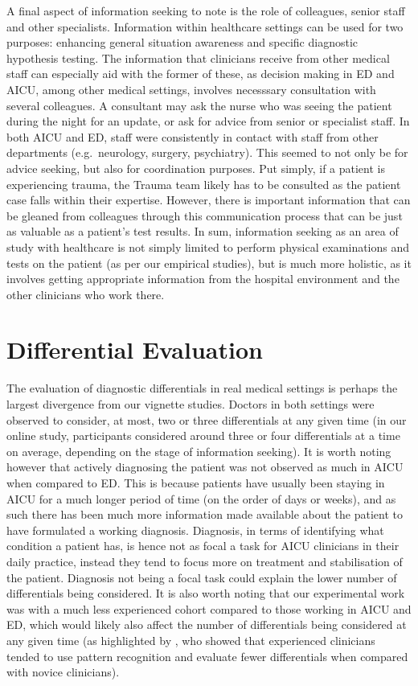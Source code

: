 \documentclass[a4paper, nobind]{templates/ociamthesis}
\begin{document}
\hfill\break
A final aspect of information seeking to note is the role of colleagues, senior staff and other specialists. Information within healthcare settings can be used for two purposes: enhancing general situation awareness and specific diagnostic hypothesis testing. The information that clinicians receive from other medical staff can especially aid with the former of these, as decision making in ED and AICU, among other medical settings, involves necesssary consultation with several colleagues. A consultant may ask the nurse who was seeing the patient during the night for an update, or ask for advice from senior or specialist staff. In both AICU and ED, staff were consistently in contact with staff from other departments (e.g.~neurology, surgery, psychiatry). This seemed to not only be for advice seeking, but also for coordination purposes. Put simply, if a patient is experiencing trauma, the Trauma team likely has to be consulted as the patient case falls within their expertise. However, there is important information that can be gleaned from colleagues through this communication process that can be just as valuable as a patient's test results. In sum, information seeking as an area of study with healthcare is not simply limited to perform physical examinations and tests on the patient (as per our empirical studies), but is much more holistic, as it involves getting appropriate information from the hospital environment and the other clinicians who work there.

\section{Differential Evaluation}\label{differential-evaluation}

The evaluation of diagnostic differentials in real medical settings is perhaps the largest divergence from our vignette studies. Doctors in both settings were observed to consider, at most, two or three differentials at any given time (in our online study, participants considered around three or four differentials at a time on average, depending on the stage of information seeking). It is worth noting however that actively diagnosing the patient was not observed as much in AICU when compared to ED. This is because patients have usually been staying in AICU for a much longer period of time (on the order of days or weeks), and as such there has been much more information made available about the patient to have formulated a working diagnosis. Diagnosis, in terms of identifying what condition a patient has, is hence not as focal a task for AICU clinicians in their daily practice, instead they tend to focus more on treatment and stabilisation of the patient. Diagnosis not being a focal task could explain the lower number of differentials being considered. It is also worth noting that our experimental work was with a much less experienced cohort compared to those working in AICU and ED, which would likely also affect the number of differentials being considered at any given time (as highlighted by \textcite{coderre2003}, who showed that experienced clinicians tended to use pattern recognition and evaluate fewer differentials when compared with novice clinicians).
\end{document}
